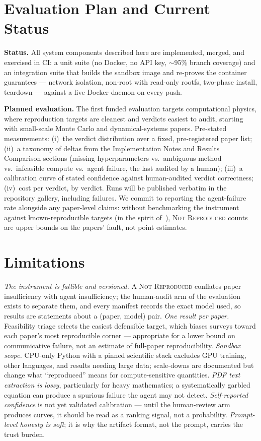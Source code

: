 \documentclass[10pt]{article}
\newcommand{\verdict}[1]{\textsc{#1}}
\begin{document}
\section{Evaluation Plan and Current Status}\label{sec:eval}

\textbf{Status.} All system components described here are implemented, merged, and exercised in CI: a unit suite (no Docker, no API key, $\sim$95\% branch coverage) and an integration suite that builds the sandbox image and re-proves the container guarantees --- network isolation, non-root with read-only rootfs, two-phase install, teardown --- against a live Docker daemon on every push.

\textbf{Planned evaluation.} The first funded evaluation targets computational physics, where reproduction targets are cleanest and verdicts easiest to audit, starting with small-scale Monte Carlo and dynamical-systems papers. Pre-stated measurements: (i)~the verdict distribution over a fixed, pre-registered paper list; (ii)~a taxonomy of deltas from the Implementation Notes and Results Comparison sections (missing hyperparameters vs.\ ambiguous method vs.\ infeasible compute vs.\ agent failure, the last audited by a human); (iii)~a calibration curve of stated confidence against human-audited verdict correctness; (iv)~cost per verdict, by verdict. Runs will be published verbatim in the repository gallery, including failures. We commit to reporting the agent-failure rate alongside any paper-level claims: without benchmarking the instrument against known-reproducible targets (in the spirit of~\cite{siegel2024,starace2025}), \verdict{Not Reproduced} counts are upper bounds on the papers' fault, not point estimates.

\section{Limitations}\label{sec:limits}

\emph{The instrument is fallible and versioned.} A \verdict{Not Reproduced} conflates paper insufficiency with agent insufficiency; the human-audit arm of the evaluation exists to separate them, and every manifest records the exact model used, so results are statements about a (paper, model) pair. \emph{One result per paper.} Feasibility triage selects the easiest defensible target, which biases surveys toward each paper's most reproducible corner --- appropriate for a lower bound on communicative failure, not an estimate of full-paper reproducibility. \emph{Sandbox scope.} CPU-only Python with a pinned scientific stack excludes GPU training, other languages, and results needing large data; scale-downs are documented but change what ``reproduced'' means for compute-sensitive quantities. \emph{PDF text extraction is lossy}, particularly for heavy mathematics; a systematically garbled equation can produce a spurious failure the agent may not detect. \emph{Self-reported confidence} is not yet validated calibration --- until the human-review arm produces curves, it should be read as a ranking signal, not a probability. \emph{Prompt-level honesty is soft}; it is why the artifact format, not the prompt, carries the trust burden.
\end{document}
